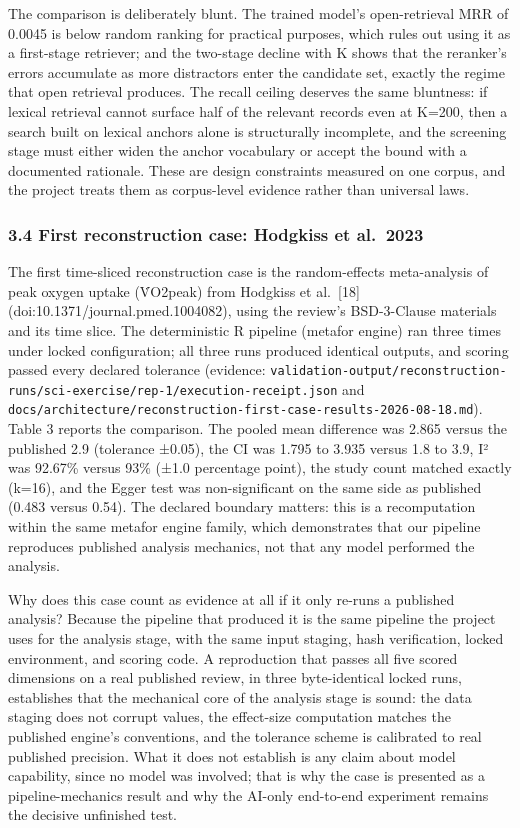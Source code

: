 \documentclass[
]{article}
\begin{document}
The comparison is deliberately blunt. The trained model's open-retrieval
MRR of 0.0045 is below random ranking for practical purposes, which
rules out using it as a first-stage retriever; and the two-stage decline
with K shows that the reranker's errors accumulate as more distractors
enter the candidate set, exactly the regime that open retrieval
produces. The recall ceiling deserves the same bluntness: if lexical
retrieval cannot surface half of the relevant records even at K=200,
then a search built on lexical anchors alone is structurally incomplete,
and the screening stage must either widen the anchor vocabulary or
accept the bound with a documented rationale. These are design
constraints measured on one corpus, and the project treats them as
corpus-level evidence rather than universal laws.

\subsubsection{3.4 First reconstruction case: Hodgkiss et
al.~2023}\label{first-reconstruction-case-hodgkiss-et-al.-2023}

The first time-sliced reconstruction case is the random-effects
meta-analysis of peak oxygen uptake (V̇O2peak) from Hodgkiss et
al.~{[}18{]} (doi:10.1371/journal.pmed.1004082), using the review's
BSD-3-Clause materials and its time slice. The deterministic R pipeline
(metafor engine) ran three times under locked configuration; all three
runs produced identical outputs, and scoring passed every declared
tolerance (evidence:
\texttt{validation-output/reconstruction-runs/sci-exercise/rep-1/execution-receipt.json}
and
\texttt{docs/architecture/reconstruction-first-case-results-2026-08-18.md}).
Table 3 reports the comparison. The pooled mean difference was 2.865
versus the published 2.9 (tolerance ±0.05), the CI was 1.795 to 3.935
versus 1.8 to 3.9, I² was 92.67\% versus 93\% (±1.0 percentage point),
the study count matched exactly (k=16), and the Egger test was
non-significant on the same side as published (0.483 versus 0.54). The
declared boundary matters: this is a recomputation within the same
metafor engine family, which demonstrates that our pipeline reproduces
published analysis mechanics, not that any model performed the analysis.

Why does this case count as evidence at all if it only re-runs a
published analysis? Because the pipeline that produced it is the same
pipeline the project uses for the analysis stage, with the same input
staging, hash verification, locked environment, and scoring code. A
reproduction that passes all five scored dimensions on a real published
review, in three byte-identical locked runs, establishes that the
mechanical core of the analysis stage is sound: the data staging does
not corrupt values, the effect-size computation matches the published
engine's conventions, and the tolerance scheme is calibrated to real
published precision. What it does not establish is any claim about model
capability, since no model was involved; that is why the case is
presented as a pipeline-mechanics result and why the AI-only end-to-end
experiment remains the decisive unfinished test.
\end{document}

